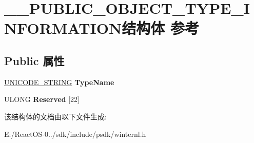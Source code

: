\hypertarget{struct_____p_u_b_l_i_c___o_b_j_e_c_t___t_y_p_e___i_n_f_o_r_m_a_t_i_o_n}{}\section{\+\_\+\+\_\+\+P\+U\+B\+L\+I\+C\+\_\+\+O\+B\+J\+E\+C\+T\+\_\+\+T\+Y\+P\+E\+\_\+\+I\+N\+F\+O\+R\+M\+A\+T\+I\+O\+N结构体 参考}
\label{struct_____p_u_b_l_i_c___o_b_j_e_c_t___t_y_p_e___i_n_f_o_r_m_a_t_i_o_n}
\subsection*{Public 属性}
\begin{DoxyCompactItemize}
\item 
\mbox{\label{struct_____p_u_b_l_i_c___o_b_j_e_c_t___t_y_p_e___i_n_f_o_r_m_a_t_i_o_n_a7225f8c331a8bc88e5934b82f813a983}} 
\hyperlink{struct___u_n_i_c_o_d_e___s_t_r_i_n_g}{U\+N\+I\+C\+O\+D\+E\+\_\+\+S\+T\+R\+I\+NG} {\bfseries Type\+Name}
\item 
\mbox{\label{struct_____p_u_b_l_i_c___o_b_j_e_c_t___t_y_p_e___i_n_f_o_r_m_a_t_i_o_n_a3598dca01b02760f8ab392acefcf7dae}} 
U\+L\+O\+NG {\bfseries Reserved} \mbox{[}22\mbox{]}
\end{DoxyCompactItemize}


该结构体的文档由以下文件生成\+:\begin{DoxyCompactItemize}
\item 
E\+:/\+React\+O\+S-\/0../sdk/include/psdk/winternl.\+h\end{DoxyCompactItemize}
